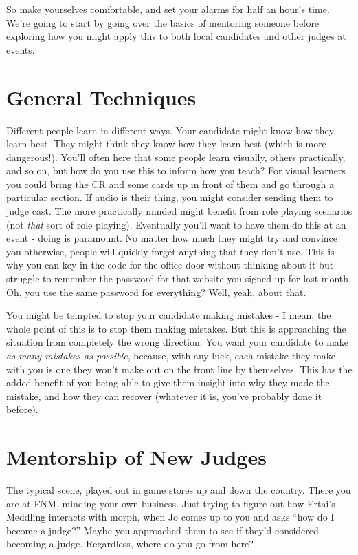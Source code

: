\documentclass[10pt,a4paper]{article}
\begin{document}
So make yourselves comfortable, and set your alarms for half an hour's time. We're going to start by going over the basics of mentoring someone before exploring how you might apply this to both local candidates and other judges at events.

\section{General Techniques}
Different people learn in different ways. Your candidate might know how they learn best. They might think they know how they learn best (which is more dangerous!). You'll often here that some people learn visually, others practically, and so on, but how do you use this to inform how you teach? For visual learners you could bring the CR and some cards up in front of them and go through a particular section. If audio is their thing, you might consider sending them to judge cast. The more practically minded might benefit from role playing scenarios (not \textit{that} sort of role playing). Eventually you'll want to have them do this at an event - doing is paramount. No matter how much they might try and convince you otherwise, people will quickly forget anything that they don't use. This is why you can key in the code for the office door without thinking about it but struggle to remember the password for that website you signed up for last month. Oh, you use the same password for everything? Well, yeah, about that.

You might be tempted to stop your candidate making mistakes - I mean, the whole point of this is to stop them making mistakes. But this is approaching the situation from completely the wrong direction. You want your candidate to make \textit{as many mistakes as possible}, because, with any luck, each mistake they make with you is one they won't make out on the front line by themselves. This has the added benefit of you being able to give them insight into why they made the mistake, and how they can recover (whatever it is, you've probably done it before).

\section{Mentorship of New Judges}
The typical scene, played out in game stores up and down the country. There you are at FNM, minding your own business. Just trying to figure out how Ertai's Meddling interacts with morph, when Jo comes up to you and asks ``how do I become a judge?'' Maybe you approached them to see if they'd considered becoming a judge. Regardless, where do you go from here?
\end{document}
